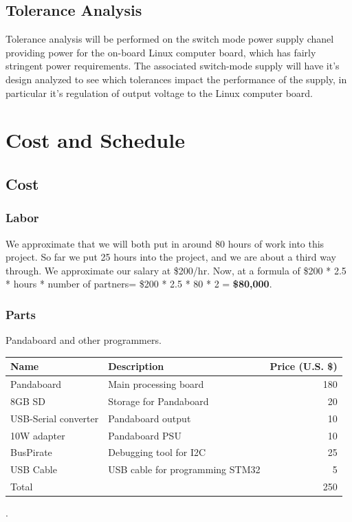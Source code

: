 \documentclass[12pt]{article}
\begin{document}
 \subsection{Tolerance Analysis}
    Tolerance analysis will be performed on the switch mode power supply chanel providing power for the on-board Linux computer board, which has fairly stringent power requirements. The associated switch-mode supply will have it's design analyzed to see which tolerances impact the performance of the supply, in particular it's regulation of output voltage to the Linux computer board.
 \section{Cost and Schedule}
 \subsection{Cost}
  \subsubsection{Labor}
   We approximate that we will both put in around 80 hours of work into this project. So far we put 25 hours into the project, and we are about a third way through. We approximate our salary at \$200/hr. Now, at a formula of \$200 * 2.5 * hours * number of partners= \$200 * 2.5 * 80 * 2  = \textbf{\$80,000}.
  \subsubsection{Parts}
  Pandaboard and other programmers.\\
\begin{tabular}{| l || l | r | }
  \hline                       
    Name & Description & Price (U.S. \$) \\ \hline
     Pandaboard & Main processing board  & 180 \\
     8GB SD & Storage for Pandaboard & 20 \\
     USB-Serial converter& Pandaboard output& 10\\
     10W adapter&Pandaboard PSU& 10\\
     BusPirate& Debugging tool for I2C&25\\
     USB Cable&USB cable for programming STM32& 5\\ \hline
     Total&&250\\
   \hline  
   \end{tabular}.\\
 
\end{document}
